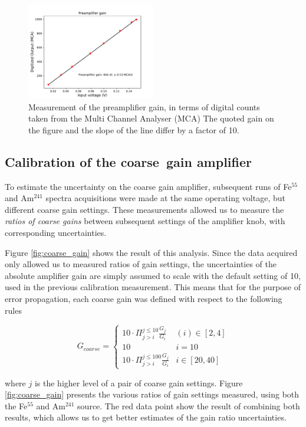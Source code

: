 \begin{figure}[htb]
  \includegraphics[scale=0.5,width=0.5\textwidth]{graphics/preamp_gain_calibration_plus_conversionfactor.pdf}
  \caption{Measurement of the preamplifier gain, in terms of digital counts taken from the Multi Channel Analyser (MCA) The quoted gain on the figure and the slope of the line differ by a factor of 10.}
  \label{fig:preamp_gain_mca}
\end{figure}


\subsection{Calibration of the coarse~gain amplifier}
\label{sec:coarse}
To estimate the uncertainty on the coarse gain amplifier, subsequent runs of Fe$^{55}$ and Am$^{241}$ spectra acquisitions were made at the same operating voltage, but different coarse gain settings. These measurements allowed us to measure the \textit{ratios of coarse gains} between subsequent settings of the amplifier knob, with corresponding uncertainties.

Figure \ref{fig:coarse_gain} shows the result of this analysis. Since the data acquired only allowed us to measured ratios of gain settings, the uncertainties of the absolute amplifier gain are simply assumed to scale with the default setting of 10, used in the previous calibration measurement. This means that for the purpose of error propagation, each coarse gain was defined with respect to the following rules

$$
G_{coarse} = \left\{
\begin{array}{ll} 
  10\cdot\Pi_{j>i}^{j\leq10}\frac{G_{j}}{G_{i}} & (i) \in [2,4] \\
  10 & i=10 \\
  10\cdot\Pi_{j>i}^{j\leq 100}\frac{G_{j}}{G_{i}} & i \in [20,40] 
\end{array}
\right.
$$

where $j$ is the higher level of a pair of coarse gain settings. Figure \ref{fig:coarse_gain} presents the various ratios of gain settings measured, using both the Fe$^{55}$ and Am$^{241}$ source. The red data point show the result of combining both results, which allows us to get better estimates of the gain ratio uncertainties.

